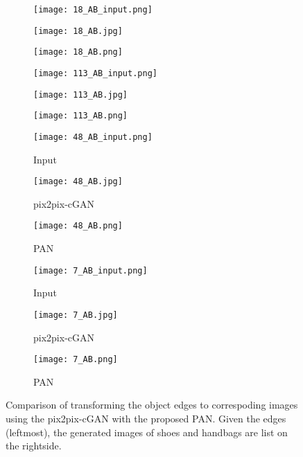 \documentclass{article}
\begin{document}
\begin{figure*}[!t]
\captionsetup[subfigure]{labelformat=empty}
\centering
 \begin{subfigure}[b]{0.16\textwidth}
    \texttt{[image: 18\_AB\_input.png]}%
    \label{fig_first_case}
\end{subfigure}
 \begin{subfigure}[b]{0.16\textwidth}
    \texttt{[image: 18\_AB.jpg]}%
    \label{fig_first_case}
\end{subfigure}
 \begin{subfigure}[b]{0.16\textwidth}
    \texttt{[image: 18\_AB.png]}%
    \label{fig_first_case}
\end{subfigure}
 \begin{subfigure}[b]{0.16\textwidth}
    \texttt{[image: 113\_AB\_input.png]}%
    \label{fig_first_case}
\end{subfigure}
 \begin{subfigure}[b]{0.16\textwidth}
    \texttt{[image: 113\_AB.jpg]}%
    \label{fig_first_case}
\end{subfigure}
 \begin{subfigure}[b]{0.16\textwidth}
    \texttt{[image: 113\_AB.png]}%
    \label{fig_first_case}
\end{subfigure}
 \begin{subfigure}[b]{0.16\textwidth}
    \texttt{[image: 48\_AB\_input.png]}
    \caption{Input}
    \label{fig_first_case}
\end{subfigure}
 \begin{subfigure}[b]{0.16\textwidth}
    \texttt{[image: 48\_AB.jpg]}
    \caption{pix2pix-cGAN}
    \label{fig_first_case}
\end{subfigure}
 \begin{subfigure}[b]{0.16\textwidth}
    \texttt{[image: 48\_AB.png]}
    \caption{PAN}
    \label{fig_first_case}
\end{subfigure}
 \begin{subfigure}[b]{0.16\textwidth}
    \texttt{[image: 7\_AB\_input.png]}
    \caption{Input}
    \label{fig_first_case}
\end{subfigure}
 \begin{subfigure}[b]{0.16\textwidth}
    \texttt{[image: 7\_AB.jpg]}
    \caption{pix2pix-cGAN}
    \label{fig_first_case}
\end{subfigure}
 \begin{subfigure}[b]{0.16\textwidth}
    \texttt{[image: 7\_AB.png]}
    \caption{PAN}
    \label{fig_first_case}
\end{subfigure}
\caption{Comparison of transforming the object edges to correspoding images using the pix2pix-cGAN with the proposed PAN. Given the edges (leftmost), the generated images of shoes and handbags are list on the rightside.}
\label{edges}
\end{figure*}
\end{document}
